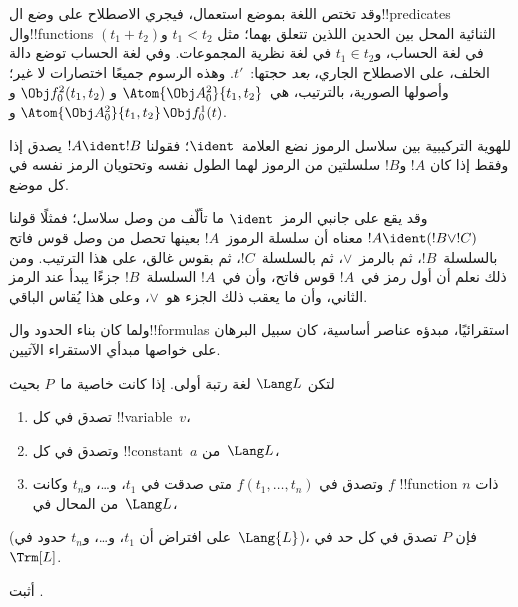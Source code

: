 \documentclass[../../../include/open-logic-section]{subfiles}
\begin{document}
وقد تختص اللغة بموضع استعمال، فيجري الاصطلاح على وضع ال!!{predicate}s
وال!!{function}s الثنائية المحل بين الحدين اللذين تتعلق بهما؛ مثل
$t_1 < t_2$ و$(t_1 + t_2)$ في لغة الحساب، و$t_1 \in t_2$ في لغة
نظرية المجموعات. وفي لغة الحساب توضع دالة الخلف، على الاصطلاح الجاري،
\emph{بعد} حجتها:~$t'$. وهذه الرسوم جميعًا اختصارات لا غير؛ وأصولها
الصورية، بالترتيب، هي~$\Atom{\Obj A^2_0}{t_1, t_2}$ و
$\Obj f^2_0(t_1, t_2)$ و$\Atom{\Obj A^2_0}{t_1, t_2}$ و$\Obj f^1_0(t)$.

\begin{defn}
للهوية التركيبية بين سلاسل الرموز نضع العلامة~$\ident$؛ فقولنا
$!A \ident !B$ يصدق إذا وفقط إذا كان $!A$ و$!B$ سلسلتين من الرموز لهما
الطول نفسه وتحتويان الرمز نفسه في كل موضع.
\end{defn}

وقد يقع على جانبي الرمز~$\ident$ ما تألّف من وصل سلاسل؛ فمثلًا قولنا
$!A \ident (!B \lor !C)$ معناه أن سلسلة الرموز~$!A$ بعينها تحصل من
وصل قوس فاتح بالسلسلة~$!B$، ثم بالرمز~$\lor$، ثم بالسلسلة~$!C$، ثم
بقوس غالق، على هذا الترتيب. ومن ذلك نعلم أن أول رمز في~$!A$
قوس فاتح، وأن في~$!A$ السلسلة~$!B$ جزءًا يبدأ عند الرمز الثاني،
وأن ما يعقب ذلك الجزء هو~$\lor$، وعلى هذا يُقاس الباقي.

ولما كان بناء الحدود وال!!{formula}s استقرائيًا، مبدؤه عناصر أساسية،
كان سبيل البرهان على خواصها مبدأي الاستقراء الآتيين.

\begin{lem}
    لتكن $\Lang L$ لغة رتبة أولى.
    إذا كانت خاصية ما~$P$ بحيث
    \begin{enumerate}
        \item تصدق في كل !!{variable}~$v$،
        \item وتصدق في كل !!{constant}~$a$ من~$\Lang L$،
        \item وتصدق في $f(t_1,\dotsc,t_n)$ متى صدقت في
        $t_1$، و\dots، و$t_n$ وكانت $f$ !!{function} ذات $n$ من
            المحال في~$\Lang L$،
    \end{enumerate}
    (على افتراض أن $t_1$، و\dots، و$t_n$ حدود في~$\Lang{L}$)،
    فإن $P$ تصدق في كل حد في~$\Trm[L]$.
\end{lem}

\begin{prob}
    أثبت .
\end{prob}
\end{document}
